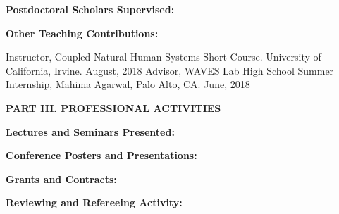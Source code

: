 \documentclass[10pt]{article}
\begin{document}
\vspace{0.5cm}
{\bf Postdoctoral Scholars Supervised:}


\vspace{0.5cm}
{\bf Other Teaching Contributions:}
\vspace{0.25cm}

Instructor, Coupled Natural-Human Systems Short Course. University of California, Irvine. August, 2018
Advisor, WAVES Lab High School Summer Internship, Mahima Agarwal, Palo Alto, CA. June, 2018
 

\vspace{0.5cm}
\textbf{PART III.  PROFESSIONAL ACTIVITIES}

\vspace{0.5cm}
\textbf{Lectures and Seminars Presented:}
\vspace{0.25cm}
{\setlength{\extrarowheight}{3.5pt}

}


\vspace{0.5cm}
\textbf{Conference Posters and Presentations:}
\vspace{0.25cm}
{\setlength{\extrarowheight}{3.5pt}

}

\vspace{0.5cm}
\textbf{Grants and Contracts:}
\vspace{0.25cm}
{\setlength{\extrarowheight}{3.5pt}

}

\vspace{0.5cm}
\textbf{Reviewing and Refereeing Activity:}
\vspace{0.2cm}

\end{document}
